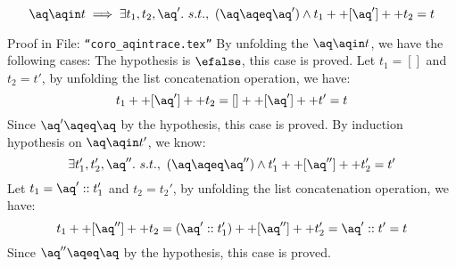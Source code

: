 \begin{coro}
\label{coro:aqintrace}
\[
\aq \aqin t \implies \exists t_1, t_2, \aq'. ~ s.t., ~ (\aq \aqeq \aq') \land t_1 ++ [\aq'] ++ t_2 = t	
\]
\end{coro}
\begin{subproof}
Proof in File: {\tt ``coro\_aqintrace.tex''}
% 
By unfolding the $\aq \aqin t$, we have the following cases:
%
 The hypothesis is $\efalse$, this case is proved.
%
%
Let $t_1 = []$ and $t_2 = t'$, by unfolding the list concatenation operation, we have:
%
\[
	t_1 ++ [\aq'] ++ t_2 = [] ++ [\aq'] ++ t' = t
\]
%
Since $\aq' \aqeq \aq$ by the hypothesis, this case is proved.
%
%
By induction hypothesis on $\aq \aqin t'$, we know:
%
\[
	\exists t_1', t_2', \aq''. ~ s.t., ~ (\aq \aqeq \aq'') \land t_1' ++ [\aq''] ++ t_2' = t'	
\]
%
Let $t_1 = \aq'::t_1'$ and $t_2 = t_2'$, by unfolding the list concatenation operation, we have:
%
\[
	t_1 ++ [\aq''] ++ t_2 = (\aq':: t_1') ++ [\aq''] ++ t_2' = \aq'::t' = t
\]
%
Since $\aq'' \aqeq \aq$ by the hypothesis, this case is proved.
%
\end{subproof}